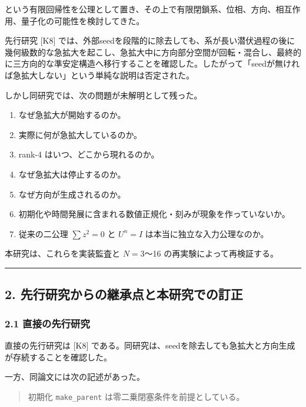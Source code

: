 \documentclass[
  a4paper,
]{ltjsarticle}
\providecommand{\tightlist}{%
  \setlength{\itemsep}{0pt}\setlength{\parskip}{0pt}}
\begin{document}
という有限回帰性を公理として置き、その上で有限閉鎖系、位相、方向、相互作用、量子化の可能性を検討してきた。

先行研究 {[}K8{]}
では、外部seedを段階的に除去しても、系が長い潜伏過程の後に幾何級数的な急拡大を起こし、急拡大中に方向部分空間が回転・混合し、最終的に三方向的な準安定構造へ移行することを確認した。したがって「seedが無ければ急拡大しない」という単純な説明は否定された。

しかし同研究では、次の問題が未解明として残った。

\begin{enumerate}
\def\labelenumi{\arabic{enumi}.}
\tightlist
\item
  なぜ急拡大が開始するのか。
\item
  実際に何が急拡大しているのか。
\item
  rank-4 はいつ、どこから現れるのか。
\item
  なぜ急拡大は停止するのか。
\item
  なぜ方向が生成されるのか。
\item
  初期化や時間発展に含まれる数値正規化・刻みが現象を作っていないか。
\item
  従来の二公理 \(\sum z^2=0\) と \(U^n=I\)
  は本当に独立な入力公理なのか。
\end{enumerate}

本研究は、これらを実装監査と \(N=3\)〜16 の再実験によって再検証する。

\begin{center}\rule{0.5\linewidth}{0.5pt}\end{center}

\subsection{2.
先行研究からの継承点と本研究での訂正}\label{ux5148ux884cux7814ux7a76ux304bux3089ux306eux7d99ux627fux70b9ux3068ux672cux7814ux7a76ux3067ux306eux8a02ux6b63}

\subsubsection{2.1
直接の先行研究}\label{ux76f4ux63a5ux306eux5148ux884cux7814ux7a76}

直接の先行研究は {[}K8{]}
である。同研究は、seedを除去しても急拡大と方向生成が存続することを確認した。

一方、同論文には次の記述があった。

\begin{quote}
初期化 \texttt{make\_parent} は零二乗閉塞条件を前提としている。
\end{quote}
\end{document}
